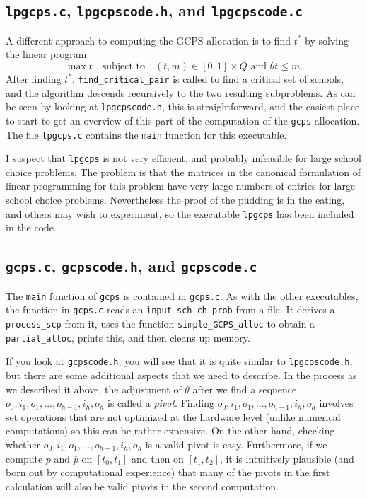 \documentclass[12pt]{article}
\theoremstyle{definition}
\newcommand{\barp}{\overline{p}}
\begin{document}
\begin{appendix}
\subsection{\texttt{lpgcps.c}, \texttt{lpgcpscode.h}, and \texttt{lpgcpscode.c}}

A different approach to computing the GCPS allocation is to find $t^*$
by solving the linear program
$$\max t \quad \text{subject to} \quad \text{$(t,m) \in [0,1] \times
  Q$ and $\theta t \le m$}.$$ After finding $t^*$,
\texttt{find\_critical\_pair} is called to find a critical set of
schools, and the algorithm descends recursively to the two resulting
subproblems.  As can be seen by looking at \texttt{lpgcpscode.h}, this
is straightforward, and the easiest place to start to get an overview
of this part of the computation of the \texttt{gcps} allocation.  The
file \texttt{lpgcps.c} contains the \texttt{main} function for this
executable.

I suspect that \texttt{lpgcps} is not very efficient, and probably
infeasible for large school choice problems.  The problem is that the
matrices in the canonical formulation of linear programming for this
problem have very large numbers of entries for large school choice
problems.  Nevertheless the proof of the pudding is in the eating, and
others may wish to experiment, so the executable \texttt{lpgcps} has
been included in the code.

\subsection{\texttt{gcps.c}, \texttt{gcpscode.h}, and \texttt{gcpscode.c}} \label{sec:GcpsTop}

The \texttt{main} function of \texttt{gcps} is contained in
\texttt{gcps.c}.  As with the other executables, the 
function in \texttt{gcps.c} reads an \texttt{input\_sch\_ch\_prob}
from a file.  It derives a \texttt{process\_scp} from it, uses the
function \texttt{simple\_GCPS\_alloc} to obtain a
\texttt{partial\_alloc}, prints this, and then cleans up memory.

If you look at \texttt{gcpscode.h}, you will see that it is quite
similar to \texttt{lpgcpscode.h}, but there are some additional
aspects that we need to describe.  In the process as we described it
above, the adjustment of $\theta$ after we find a sequence
$o_0,i_1,o_1, \ldots, o_{h-1},i_h, o_h$ is called a \emph{pivot}.
Finding $o_0,i_1,o_1, \ldots, o_{h-1},i_h, o_h$ involves set
operations that are not optimized at the hardware level (unlike
numerical computations) so this can be rather expensive.  On the other
hand, checking whether $o_0,i_1,o_1, \ldots, o_{h-1},i_h, o_h$ is a
valid pivot is easy.  Furthermore, if we compute $p$ and $\barp$ on
$[t_0,t_1]$ and then on $[t_1,t_2]$, it is intuitively plausible (and
born out by computational experience) that many of the pivots in the
first calculation will also be valid pivots in the second computation.


\end{appendix}
\end{document}
